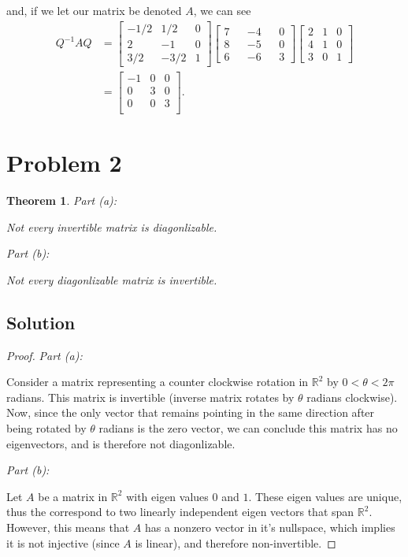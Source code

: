 \documentclass[10pt,a4paper]{article}
\makeatletter
\newtheorem{theorem}{Theorem}
\newcommand{\proofpart}[2]{%
  \par
  \addvspace{\medskipamount}%
  \noindent\emph{Part #1: #2}\par\nobreak
  \addvspace{\smallskipamount}%
  \@afterheading
}
\theoremstyle{definition}
\makeatother
\begin{document}
and, if we let our matrix be denoted $A$, we can see
\begin{align*}
Q^{-1} A Q &= 
\begin{bmatrix}
-1/2 & 1/2 & 0\\
2 & -1 & 0\\
3/2 & -3/2 & 1
\end{bmatrix}\begin{bmatrix}
7 && -4 && 0\\
8 && -5 && 0\\
6 && -6 && 3
\end{bmatrix} \begin{bmatrix}
2 & 1 & 0\\
4 & 1 & 0\\
3 & 0 & 1
\end{bmatrix}   \\
&= \begin{bmatrix}
-1 & 0 & 0\\
0 & 3 & 0\\
0 & 0 & 3\\
\end{bmatrix}.
\end{align*}

\section*{Problem 2}
\begin{theorem}
\proofpart{(a)}{} Not every invertible matrix is diagonlizable.
\proofpart{(b)}{} Not every diagonlizable matrix is invertible.
\end{theorem}

\subsection*{Solution}
\begin{proof}
\proofpart{(a)}{} Consider a matrix representing a counter clockwise rotation in $\mathbb{R}^2$ by $0 < \theta < 2 \pi$ radians. This matrix is invertible (inverse matrix rotates by $\theta$ radians clockwise). Now, since the only vector that remains pointing in the same direction after being rotated by $\theta$ radians is the zero vector, we can conclude this matrix has no eigenvectors, and is therefore not diagonlizable.

\proofpart{(b)}{} Let $A$ be a matrix in $\mathbb{R}^2$ with eigen values $0$ and $1$. These eigen values are unique, thus the correspond to two linearly independent eigen vectors that span $\mathbb{R}^2$. However, this means that $A$ has a nonzero vector in it's nullspace, which implies it is not injective (since $A$ is linear), and therefore non-invertible.
\end{proof}
\end{document}
